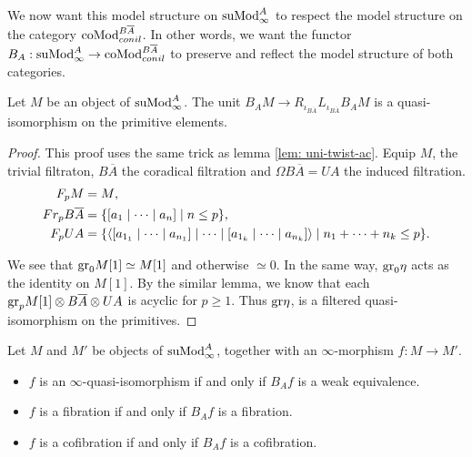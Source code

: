 \documentclass[../thesis.tex]{subfiles}
\begin{document}
            We now want this model structure on $\tt{suMod}^A_\infty$ to respect the model structure on the category $\tt{coMod}_{conil}^{B\overline{A}}$. In other words, we want the functor $B_A : \tt{suMod}_\infty^A \to \tt{coMod}_{conil}^{B\overline{A}}$ to preserve and reflect the model structure of both categories.

            \begin{lemma}
                Let $M$ be an object of $\tt{suMod}_\infty^A$. The unit $B_AM \to R_{\iota_{B\overline{A}}}L_{\iota_{B\overline{A}}}B_AM$ is a quasi-isomorphism on the primitive elements.
            \end{lemma}

            \begin{proof}
                This proof uses the same trick as lemma \ref{lem: uni-twist-ac}. Equip $M$, the trivial filtraton, $B\overline{A}$ the coradical filtration and $\Omega B\overline{A} = UA$ the induced filtration.
                \begin{align*}
                    F_pM & = M\tt{,} \\
                    Fr_pB\overline{A} & = \startset{[a_1 \mid \cdots \mid a_n] \mid n \leq p}\tt{,} \\
                    F_p UA & = \startset{\langle [a_{1_1} \mid \cdots \mid a_{n_1}] \mid \cdots \mid [a_{1_k} \mid \cdots \mid a_{n_k}] \rangle \mid n_1 + \cdots + n_k \leq p}\tt{.}
                \end{align*} 

                We see that $\tt{gr}_0M[1] \simeq M[1]$ and otherwise $\simeq 0$. In the same way, $\tt{gr}_0\eta$ acts as the identity on $M[1]$. By the similar lemma, we know that each $\tt{gr}_p M[1] \otimes B\overline{A} \otimes UA$ is acyclic for $p \geq 1$. Thus $\tt{gr}\eta$, is a filtered quasi-isomorphism on the primitives.

            \end{proof}

            \begin{proposition}
                Let $M$ and $M'$ be objects of $\tt{suMod}_\infty^A$, together with an $\infty$-morphism $f : M \to M'$.
                \begin{itemize}
                    \item $f$ is an $\infty$-quasi-isomorphism if and only if $B_Af$ is a weak equivalence.
                    \item $f$ is a fibration if and only if $B_Af$ is a fibration.
                    \item $f$ is a cofibration if and only if $B_Af$ is a cofibration.
                \end{itemize}
            \end{proposition}
\end{document}
